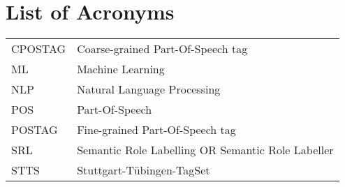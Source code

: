 {}
\chapter*{List of Acronyms}

\begin{supertabular}{lp{12.5cm}}
CPOSTAG &  Coarse-grained Part-Of-Speech tag\\
ML & Machine Learning\\
NLP & Natural Language Processing\\
POS & Part-Of-Speech\\
POSTAG & Fine-grained Part-Of-Speech tag\\
SRL & Semantic Role Labelling OR Semantic Role Labeller\\
STTS & Stuttgart-Tübingen-TagSet\\
\end{supertabular}

\newpage
